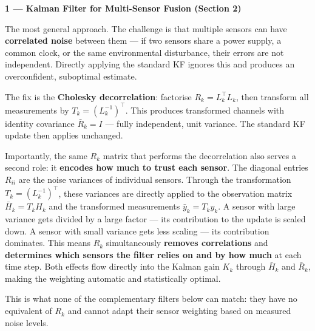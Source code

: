 \documentclass[12pt, a4paper]{article}
\begin{document}
\begin{keybox}
  \textbf{1 --- Kalman Filter for Multi-Sensor Fusion (Section 2)}

  The most general approach.
  The challenge is that multiple sensors can have \textbf{correlated noise}
  between them --- if two sensors share a power supply, a common clock, or
  the same environmental disturbance, their errors are not independent.
  Directly applying the standard KF ignores this and produces an
  overconfident, suboptimal estimate.

  The fix is the \textbf{Cholesky decorrelation}: factorise
  $R_k = L_k^\top L_k$, then transform all measurements by
  $T_k = (L_k^{-1})^\top$.
  This produces transformed channels with identity covariance
  $\bar{R}_k = I$ --- fully independent, unit variance.
  The standard KF update then applies unchanged.

  Importantly, the same $R_k$ matrix that performs the decorrelation also
  serves a second role: it \textbf{encodes how much to trust each sensor}.
  The diagonal entries $R_{ii}$ are the noise variances of individual
  sensors.
  Through the transformation $T_k = (L_k^{-1})^\top$, these variances are
  directly applied to the observation matrix $\bar{H}_k = T_k H_k$ and the
  transformed measurements $\bar{y}_k = T_k y_k$.
  A sensor with large variance gets divided by a large factor --- its
  contribution to the update is scaled down.
  A sensor with small variance gets less scaling --- its contribution
  dominates.
  This means $R_k$ simultaneously \textbf{removes correlations} and
  \textbf{determines which sensors the filter relies on and by how much}
  at each time step.
  Both effects flow directly into the Kalman gain $K_k$ through
  $\bar{H}_k$ and $\bar{R}_k$, making the weighting automatic and
  statistically optimal.

  This is what none of the complementary filters below can match:
  they have no equivalent of $R_k$ and cannot adapt their sensor
  weighting based on measured noise levels.
\end{keybox}

\vspace{6pt}
\end{document}
